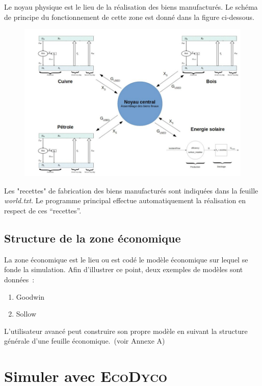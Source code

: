 \documentclass[12pt,a4paper]{article}%
\newcommand{\ed}{\textsc{EcoDyco}}
\begin{document}
Le noyau physique est le lieu de la réalisation des biens manufacturés. Le
schéma de principe du fonctionnement de cette zone est donné dans la figure ci-dessous.

\begin{figure}[h]
\centering \includegraphics[width=1.0\textwidth]{figures/NoyauCentral.jpg}\end{figure}

Les "recettes" de fabrication des biens manufacturés sont indiquées dans la
feuille \textit{world.txt}. Le programme principal effectue automatiquement la
réalisation en respect de ces "`recettes"'.

\subsection{Structure de la zone économique}

La zone économique est le lieu ou est codé le modèle économique sur lequel
se fonde la simulation. Afin d'illustrer ce point, deux exemples de
modèles sont données~:

\begin{enumerate}
\item Goodwin

\item Sollow
\end{enumerate}

L'utilisateur avancé peut construire son propre modèle en suivant la
structure générale d'une feuille économique.~(voir Annexe A)

\section{Simuler avec \ed}
\end{document}
